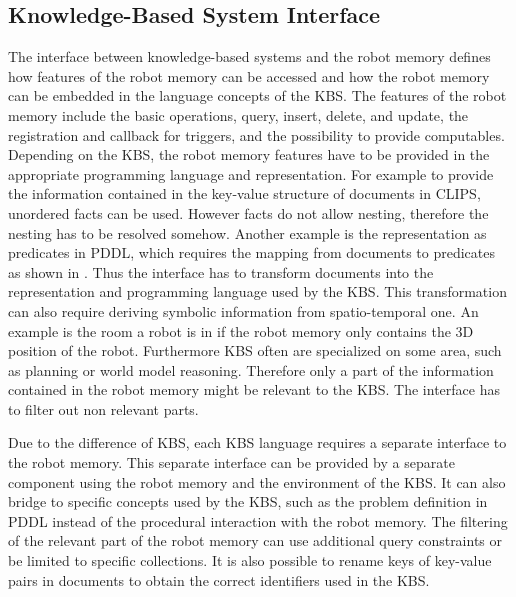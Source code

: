 \subsection{Knowledge-Based System Interface}
\label{sec:kbs-interface}
The interface between knowledge-based systems and the robot memory
defines how features of the robot memory can be accessed and how the
robot memory can be embedded in the language concepts of the KBS. The
features of the robot memory include the basic operations, query,
insert, delete, and update, the registration and callback for
triggers, and the possibility to provide computables.  Depending on
the KBS, the robot memory features have to be provided in the
appropriate programming language and representation. For example to
provide the information contained in the key-value structure of
documents in CLIPS, unordered facts can be used. However facts do not
allow nesting, therefore the nesting has to be resolved
somehow. Another example is the representation as predicates in PDDL,
which requires the mapping from documents to predicates as shown in
. Thus the interface has to transform documents
into the representation and programming language used by the KBS. This
transformation can also require deriving symbolic information from
spatio-temporal one. An example is the room a robot is in if the robot
memory only contains the 3D position of the robot. Furthermore KBS
often are specialized on some area, such as planning or world model
reasoning. Therefore only a part of the information contained in the
robot memory might be relevant to the KBS. The interface has to filter
out non relevant parts.

Due to the difference of KBS, each KBS language requires a separate
interface to the robot memory. This separate interface can be provided
by a separate component using the robot memory and the environment of
the KBS. It can also bridge to specific concepts used by the KBS, such
as the problem definition in PDDL instead of the procedural
interaction with the robot memory. The filtering of the relevant part
of the robot memory can use additional query constraints or be limited
to specific collections. It is also possible to rename keys of
key-value pairs in documents to obtain the correct identifiers used in
the KBS.

